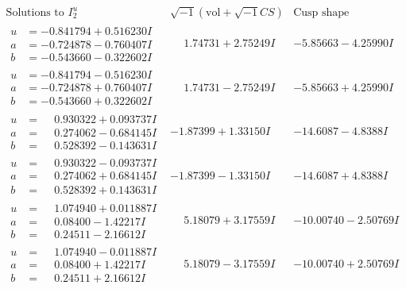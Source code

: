 \documentclass[1p]{elsarticle_modified}
\theoremstyle{definition}
\newcommand{\I}{\sqrt{-1}}
\begin{document}
$$\begin{array}{c|c|c}  
\text{Solutions to }I^u_{2}& \I (\text{vol} + \sqrt{-1}CS) & \text{Cusp shape}\\
 \hline 
\begin{aligned}
u &= -0.841794 + 0.516230 I \\
a &= -0.724878 - 0.760407 I \\
b &= -0.543660 - 0.322602 I\end{aligned}
 & \phantom{-}1.74731 + 2.75249 I & -5.85663 - 4.25990 I \\ \hline\begin{aligned}
u &= -0.841794 - 0.516230 I \\
a &= -0.724878 + 0.760407 I \\
b &= -0.543660 + 0.322602 I\end{aligned}
 & \phantom{-}1.74731 - 2.75249 I & -5.85663 + 4.25990 I \\ \hline\begin{aligned}
u &= \phantom{-}0.930322 + 0.093737 I \\
a &= \phantom{-}0.274062 - 0.684145 I \\
b &= \phantom{-}0.528392 - 0.143631 I\end{aligned}
 & -1.87399 + 1.33150 I & -14.6087 - 4.8388 I \\ \hline\begin{aligned}
u &= \phantom{-}0.930322 - 0.093737 I \\
a &= \phantom{-}0.274062 + 0.684145 I \\
b &= \phantom{-}0.528392 + 0.143631 I\end{aligned}
 & -1.87399 - 1.33150 I & -14.6087 + 4.8388 I \\ \hline\begin{aligned}
u &= \phantom{-}1.074940 + 0.011887 I \\
a &= \phantom{-}0.08400 - 1.42217 I \\
b &= \phantom{-}0.24511 - 2.16612 I\end{aligned}
 & \phantom{-}5.18079 + 3.17559 I & -10.00740 - 2.50769 I \\ \hline\begin{aligned}
u &= \phantom{-}1.074940 - 0.011887 I \\
a &= \phantom{-}0.08400 + 1.42217 I \\
b &= \phantom{-}0.24511 + 2.16612 I\end{aligned}
 & \phantom{-}5.18079 - 3.17559 I & -10.00740 + 2.50769 I \\ \hline\begin{aligned}

\end{aligned}
\end{array}$$
\end{document}
